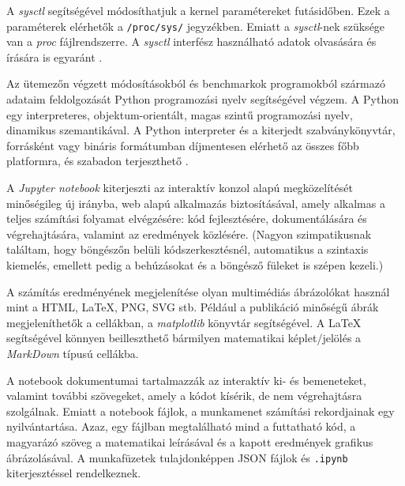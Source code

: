 
A \textit{sysctl} segítségével módosíthatjuk a kernel paramétereket futásidőben. Ezek a paraméterek elérhetők a \texttt{/proc/sys/} jegyzékben. Emiatt a \textit{sysctl}-nek szüksége van a \textit{proc} fájlrendszerre. A \textit{sysctl} interfész használható adatok olvasására és írására is egyaránt \cite{rubini1997kernel}.


Az ütemezőn végzett módosításokból és benchmarkok programokból származó adataim feldolgozását Python programozási nyelv segítségével végzem.
A Python egy interpreteres, objektum-orientált, magas szintű programozási nyelv, dinamikus szemantikával.
A Python interpreter és a kiterjedt szabványkönyvtár, forrásként vagy bináris formátumban díjmentesen elérhető az összes főbb platformra, és szabadon terjeszthető \cite{van2007python}.


A \textit{Jupyter notebook} kiterjeszti az interaktív konzol alapú megközelítését minőségileg új irányba, web alapú alkalmazás biztosításával, amely alkalmas a teljes számítási folyamat elvégzésére: kód fejlesztésére, dokumentálására és végrehajtására, valamint az eredmények közlésére.
(Nagyon szimpatikusnak találtam, hogy böngészőn belüli kódszerkesztésnél, automatikus a szintaxis kiemelés, emellett pedig a behúzásokat és a böngésző füleket is szépen kezeli.)

A számítás eredményének megjelenítése olyan multimédiás ábrázolókat használ mint a HTML, LaTeX, PNG, SVG stb. Például a publikáció minőségű ábrák megjeleníthetők a cellákban, a \textit{matplotlib} könyvtár segítségével. A LaTeX segítségével könnyen beilleszthető bármilyen matematikai képlet/jelölés a \textit{MarkDown} típusú cellákba.


A notebook dokumentumai tartalmazzák az interaktív ki- és bemeneteket, valamint további szövegeket, amely a kódot kísérik, de nem végrehajtásra szolgálnak. 
Emiatt a notebook fájlok, a munkamenet számítási rekordjainak egy nyilvántartása. Azaz, egy fájlban megtalálható mind a futtatható kód, a magyarázó szöveg a matematikai leírásával és a kapott eredmények grafikus ábrázolásával. A munkafüzetek tulajdonképpen JSON fájlok és \texttt{.ipynb} kiterjesztéssel rendelkeznek.

